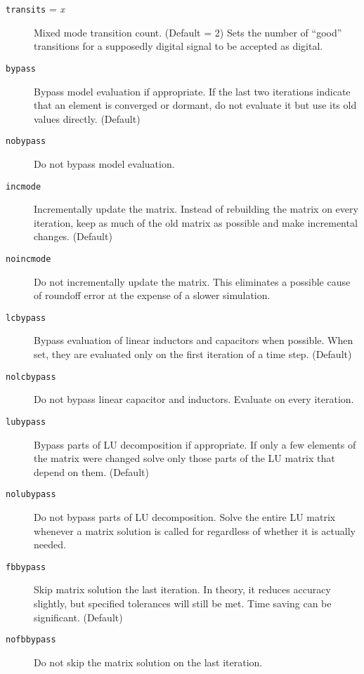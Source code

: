 \begin{description}
\item[{\tt transits} = {\it x}] Mixed mode transition count. (Default = 2)
Sets the number of ``good'' transitions for a supposedly digital signal
to be accepted as digital.

\item[{\tt bypass}] 
Bypass model evaluation if appropriate.  If the last two iterations
indicate that an element is converged or dormant, do not evaluate it
but use its old values directly.  (Default)

\item[{\tt nobypass}]
Do not bypass model evaluation.

\item[{\tt incmode}]
Incrementally update the matrix.  Instead of rebuilding the matrix on
every iteration, keep as much of the old matrix as possible and make
incremental changes.  (Default)

\item[{\tt noincmode}]
Do not incrementally update the matrix.  This eliminates a possible
cause of roundoff error at the expense of a slower simulation.

\item[{\tt lcbypass}]
Bypass evaluation of linear inductors and capacitors when possible.
When set, they are evaluated only on the first iteration of a time
step. (Default)

\item[{\tt nolcbypass}]
Do not bypass linear capacitor and inductors.  Evaluate on every
iteration.

\item[{\tt lubypass}] Bypass parts of LU decomposition if appropriate.  If
only a few elements of the matrix were changed solve only those parts
of the LU matrix that depend on them.  (Default)

\item[{\tt nolubypass}]
Do not bypass parts of LU decomposition.  Solve the entire LU matrix
whenever a matrix solution is called for regardless of whether it is
actually needed.

\item[{\tt fbbypass}]
Skip matrix solution the last iteration.  In theory, it reduces
accuracy slightly, but specified tolerances will still be met.  Time
saving can be significant.  (Default)

\item[{\tt nofbbypass}]
Do not skip the matrix solution on the last iteration.


\end{description}
